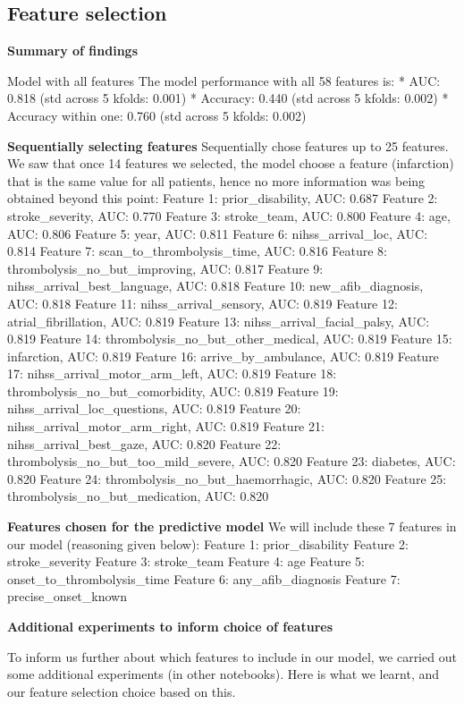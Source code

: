 \subsection{Feature selection}

\textbf{Summary of findings}

Model with all features
The model performance with all 58 features is:
* AUC: 0.818 (std across 5 kfolds: 0.001)
* Accuracy: 0.440 (std across 5 kfolds: 0.002)
* Accuracy within one: 0.760 (std across 5 kfolds: 0.002)

\textbf{Sequentially selecting features}
Sequentially chose features up to 25 features. We saw that once 14 features we selected, the model choose a feature (infarction) that is the same value for all patients, hence no more information was being obtained beyond this point:
Feature  1: prior\_disability, AUC: 0.687
Feature  2: stroke\_severity, AUC: 0.770
Feature  3: stroke\_team, AUC: 0.800
Feature  4: age, AUC: 0.806
Feature  5: year, AUC: 0.811
Feature  6: nihss\_arrival\_loc, AUC: 0.814
Feature  7: scan\_to\_thrombolysis\_time, AUC: 0.816
Feature  8: thrombolysis\_no\_but\_improving, AUC: 0.817
Feature  9: nihss\_arrival\_best\_language, AUC: 0.818
Feature 10: new\_afib\_diagnosis, AUC: 0.818
Feature 11: nihss\_arrival\_sensory, AUC: 0.819
Feature 12: atrial\_fibrillation, AUC: 0.819
Feature 13: nihss\_arrival\_facial\_palsy, AUC: 0.819
Feature 14: thrombolysis\_no\_but\_other\_medical, AUC: 0.819
Feature 15: infarction, AUC: 0.819
Feature 16: arrive\_by\_ambulance, AUC: 0.819
Feature 17: nihss\_arrival\_motor\_arm\_left, AUC: 0.819
Feature 18: thrombolysis\_no\_but\_comorbidity, AUC: 0.819
Feature 19: nihss\_arrival\_loc\_questions, AUC: 0.819
Feature 20: nihss\_arrival\_motor\_arm\_right, AUC: 0.819
Feature 21: nihss\_arrival\_best\_gaze, AUC: 0.820
Feature 22: thrombolysis\_no\_but\_too\_mild\_severe, AUC: 0.820
Feature 23: diabetes, AUC: 0.820
Feature 24: thrombolysis\_no\_but\_haemorrhagic, AUC: 0.820
Feature 25: thrombolysis\_no\_but\_medication, AUC: 0.820

\textbf{Features chosen for the predictive model}
We will include these 7 features in our model (reasoning given below):
Feature  1: prior\_disability
Feature  2: stroke\_severity
Feature  3: stroke\_team
Feature  4: age
Feature  5: onset\_to\_thrombolysis\_time
Feature  6: any\_afib\_diagnosis
Feature  7: precise\_onset\_known

\textbf{Additional experiments to inform choice of features}

To inform us further about which features to include in our model, we carried out some additional experiments (in other notebooks). Here is what we learnt, and our feature selection choice based on this.

